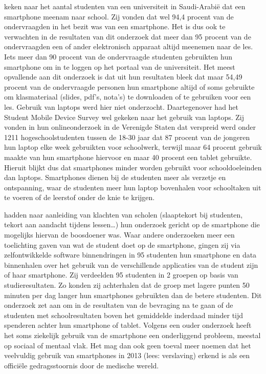 \textcite{Alfawareh2014} keken naar het aantal studenten van een universiteit in Saudi-Arabië dat een smartphone meenam naar school. Zij vonden dat wel 94,4 procent van de ondervraagden in het bezit was van een smartphone. Het is dus ook te verwachten in de resultaten van dit onderzoek dat meer dan 95 procent van de ondervraagden een of ander elektronisch apparaat altijd meenemen naar de les. Iets meer dan 90 procent van de ondervraagde studenten gebruikten hun smartphone om in te loggen op het portaal van de universiteit. Het meest opvallende aan dit onderzoek is dat uit hun resultaten bleek dat maar 54,49 procent van de ondervraagde personen hun smartphone altijd of soms gebruikte om klasmateriaal (slides, pdf’s, nota’s) te downloaden of te gebruiken voor een les. Gebruik van laptops werd hier niet onderzocht. Daartegenover had het Student Mobile Device Survey \autocite{Harris2015} wel gekeken naar het gebruik van laptops. Zij vonden in hun onlineonderzoek in de Verenigde Staten dat verspreid werd onder 1211 hogeschoolstudenten tussen de 18-30 jaar dat 87 procent van de jongeren hun laptop elke week gebruikten voor schoolwerk, terwijl maar 64 procent gebruik maakte van hun smartphone hiervoor en maar 40 procent een tablet gebruikte. Hieruit blijkt dus dat smartphones minder worden gebruikt voor schooldoeleinden dan laptops. Smartphones dienen bij de studenten meer als verzetje en ontspanning, waar de studenten meer hun laptop bovenhalen voor schooltaken uit te voeren of de leerstof onder de knie te krijgen.

\textcite{Lee2014} hadden naar aanleiding van klachten van scholen (slaaptekort bij studenten, tekort aan aandacht tijdens lessen…) hun onderzoek gericht op de smartphone die mogelijks hiervan de boosdoener was. Waar andere onderzoeken meer een toelichting gaven van wat de student doet op de smartphone, gingen zij via zelfontwikkelde software binnendringen in 95 studenten hun smartphone en data binnenhalen over het gebruik van de verschillende applicaties van de student zijn of haar smartphone. Zij verdeelden 95 studenten in 2 groepen op basis van studieresultaten. Zo konden zij achterhalen dat de groep met lagere punten 50 minuten per dag langer hun smartphones gebruikten dan de betere studenten. Dit onderzoek zet aan om in de resultaten van de bevraging na te gaan of de studenten met schoolresultaten boven het gemiddelde inderdaad minder tijd spenderen achter hun smartphone of tablet.
Volgens een ouder onderzoek \autocite{Morahan-Martin1999} heeft het soms ziekelijk gebruik van de smartphone een onderliggend probleem, meestal op sociaal of mentaal vlak. Het mag dan ook geen toeval meer noemen dat het veelvuldig gebruik van smartphones in 2013 (lees: verslaving) erkend is als een officiële gedragsstoornis door de medische wereld.  

